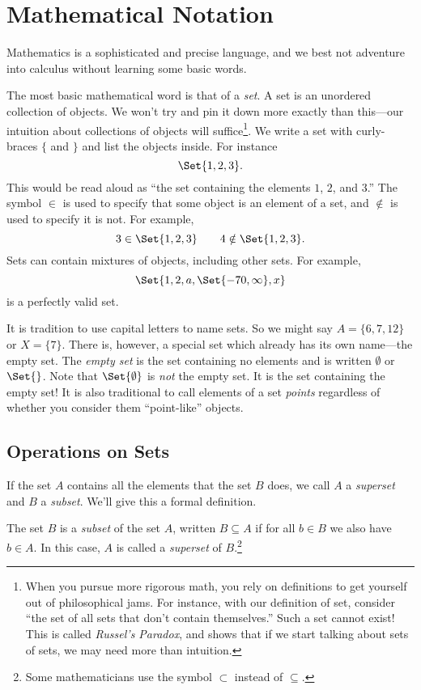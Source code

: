 \section{Mathematical Notation}
	Mathematics is a sophisticated and precise language, and
	we best not adventure into calculus without learning some
	basic words.

	The most basic mathematical word is that of a \emph{set}.  
	A set is an unordered collection of objects.  We won't try and pin
	it down more exactly than this---our intuition about collections
	of objects will suffice\footnote{ When you pursue more rigorous math,
	you rely on definitions to get yourself out of philosophical jams.  For instance,
	with our definition of set, consider ``the set of all sets that don't
	contain themselves.''  Such a set cannot exist!
	This is called \emph{Russel's Paradox}, and shows
	that if we start talking about sets of sets, we may need more than
	intuition.}. We write a set with curly-braces $\{$ and $\}$ and
	list the objects inside.  For instance
	\[
		\Set{1,2,3}.
	\]
	This would be read aloud as ``the set containing the elements $1$, $2$, and $3$.''
	The symbol $\in$\index{$\in$} is used to specify that some object is an element of a set, and
	$\notin$ is used to specify it is not.  For example,
	\[
		3\in\Set{1,2,3}\qquad 4\notin\Set{1,2,3}.
	\]
	Sets can contain mixtures of objects, including other sets.  For example,
	\[
		\Set{1,2,a,\Set{-70,\infty}, x}
	\]
	is a perfectly valid set.

	It is tradition to use capital letters to name sets.  So we might say $A=\{6,7,12\}$
	or $X=\{7\}$.  There is, however, a special set which already has its own name---the
	empty set.  The \emph{empty set} is the set containing no elements
	and is written $\emptyset$ or $\Set{}$.  Note that $\Set{\emptyset}$ is \emph{not}
	the empty set.  It is the set containing the empty set!  It is also traditional
	to call elements of a set \emph{points} regardless of whether you
	consider them ``point-like'' objects.

	\subsection{Operations on Sets}
	If the set $A$ contains all the elements that the set $B$ does, we call $A$ a \emph{superset}
	and $B$ a \emph{subset}.  We'll give this a formal
	definition.
	\begin{definition}
		The set $B$ is a \emph{subset} of the set $A$, written $B\subseteq A$ if for all
		$b\in B$ we also have $b\in A$.  In this case, $A$ is called a \emph{superset}
		of $B$.\footnote{
			Some mathematicians use the symbol $\subset$ instead of $\subseteq$.}
	\end{definition}

